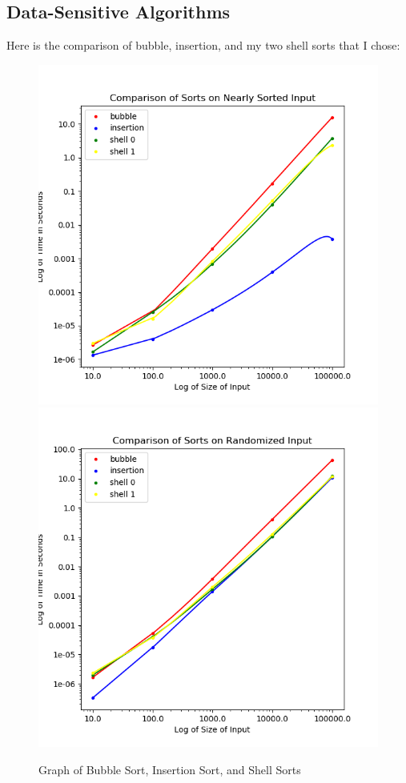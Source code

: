 \documentclass{article}
\begin{document}
\subsection{Data-Sensitive Algorithms}
    Here is the comparison of bubble, insertion, and my two shell sorts that I
    chose:
    \begin{figure}[H]
        \centering
        \includegraphics[scale=0.50]{"../images/data-sen-nearly-sorted"}
        \includegraphics[scale=0.50]{"../images/data-sen-randomized"}
        \caption{Graph of Bubble Sort, Insertion Sort, and Shell Sorts}
    \end{figure}
\end{document}
